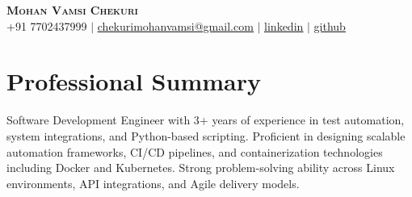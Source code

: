 \documentclass[letterpaper,11pt]{article}
\begin{document}
\begin{center}
    \textbf{\Huge \scshape Mohan Vamsi Chekuri} \\ \vspace{1pt}
    \small +91 7702437999 $|$ \href{mailto:chekurimohanvamsi@gmail.com}{\underline{chekurimohanvamsi@gmail.com}} $|$
    \href{https://www.linkedin.com/in/mvamsi73}{\underline{linkedin}} $|$
    \href{https://github.com}{\underline{github}}
\end{center}

\section{Professional Summary}
Software Development Engineer with 3+ years of experience in test automation, system integrations, and Python-based scripting. Proficient in designing scalable automation frameworks, CI/CD pipelines, and containerization technologies including Docker and Kubernetes. Strong problem-solving ability across Linux environments, API integrations, and Agile delivery models.
\end{document}

